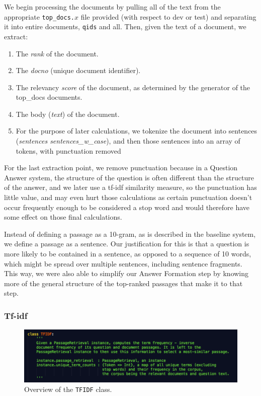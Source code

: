 \documentclass{article}
\begin{document}
We begin processing the documents by pulling all of the text from the appropriate \texttt{top\_docs.$x$} file provided (with respect to dev or test) and separating it into entire documents, \texttt{qids} and all. Then, given the text of a document, we extract:
\begin{enumerate}
\item The \textit{rank} of the document.
\item The \textit{docno} (unique document identifier).
\item The relevancy \textit{score} of the document, as determined by the generator of the top\_docs documents.
\item The body (\textit{text}) of the document.
\item For the purpose of later calculations, we tokenize the document into sentences (\textit{sentences  sentences\_w\_case}), and then those sentences into an array of tokens, with punctuation removed
\end{enumerate}

For the last extraction point, we remove punctuation because in a Question Answer system, the structure of the question is often different than the structure of the answer, and we later use a tf-idf similarity measure, so the punctuation has little value, and may even hurt those calculations as certain punctuation doesn't occur frequently enough to be considered a stop word and would therefore have some effect on those final calculations.


Instead of defining a passage as a 10-gram, as is described in the baseline system, we define a passage as a sentence. Our justification for this is that a question is more likely to be contained in a sentence, as opposed to a sequence of 10 words, which might be spread over multiple sentences, including sentence fragments. This way, we were also able to simplify our Answer Formation step by knowing more of the general structure of the top-ranked passages that make it to that step.

\subsubsection{Tf-idf}
\begin{figure}[h]
    \centering
    \includegraphics[width=1.0\textwidth]{images/tfidf.png}
    \caption{Overview of the \texttt{TFIDF} class.}
\end{figure}
\end{document}
